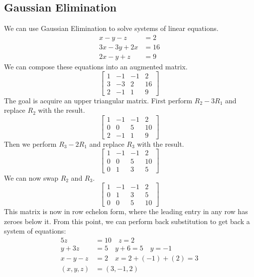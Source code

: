 \documentclass{math}
\begin{document}
\subsection*{Gaussian Elimination}
We can use Gaussian Elimination to solve systems of linear equations.
\begin{align*}
  x-y-z &= 2 \\
  3x-3y+2x &= 16 \\
  2x-y+z &= 9
\end{align*}
We can compose these equations into an augmented matrix.
\[ \begin{bmatrix}
  1 & -1 & -1 & 2 \\
  3 & -3 & 2 & 16 \\
  2 & -1 & 1 & 9
\end{bmatrix} \]
The goal is acquire an upper triangular matrix. First perform \( R_2-3R_1 \)
and replace \( R_2 \) with the result.
\[ \begin{bmatrix}
  1 & -1 & -1 & 2 \\
  0 & 0 & 5 & 10 \\
  2 & -1 & 1 & 9
\end{bmatrix} \]
Then we perform \( R_3-2R_1 \) and replace \( R_3 \) with the result.
\[ \begin{bmatrix}
  1 & -1 & -1 & 2 \\
  0 & 0 & 5 & 10 \\
  0 & 1 & 3 & 5
\end{bmatrix} \]
We can now swap \( R_2 \) and \( R_3 \).
\[ \begin{bmatrix}
  1 & -1 & -1 & 2 \\
  0 & 1 & 3 & 5 \\
  0 & 0 & 5 & 10
\end{bmatrix} \]
This matrix is now in row echelon form, where the leading entry in any row has
zeroes below it. From this point, we can perform back substitution to get back
a system of equations:
\begin{align*}
  5z &= 10 \quad z = 2 \\
  y+3z &= 5 \quad y+6 = 5 \quad y = -1 \\
  x-y-z &= 2 \quad x = 2+(-1)+(2) = 3 \\
  (x,y,z) &= (3,-1,2)
\end{align*}
\end{document}
